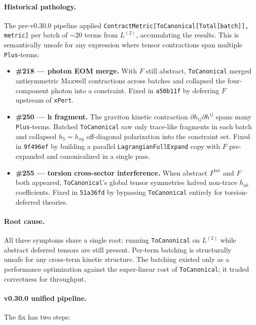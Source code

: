 \paragraph{Historical pathology.} The pre-v0.30.0 pipeline applied
\texttt{ContractMetric[ToCanonical[Total[batch]], metric]} per batch of
$\sim 20$ terms from $L^{(2)}$, accumulating the results. This is
semantically unsafe for any expression where tensor contractions span
multiple \texttt{Plus}-terms:

\begin{itemize}
  \item \textbf{\#218 — photon EOM merge.} With $F$ still abstract,
    \texttt{ToCanonical} merged antisymmetric Maxwell contractions across
    batches and collapsed the four-component photon into a constraint.
    Fixed in \texttt{a50b11f} by deferring $F$ upstream of \texttt{xPert}.
  \item \textbf{\#250 — h fragment.} The graviton
    kinetic contraction $\partial h_{ij} \partial h^{ij}$ spans many
    \texttt{Plus}-terms. Batched \texttt{ToCanonical} saw only trace-like
    fragments in each batch and collapsed $h_5 = h_{xy}$
    off-diagonal polarization into the constraint set. Fixed in
    \texttt{9f496ef} by building a parallel \texttt{LagrangianFullExpand}
    copy with $F$ pre-expanded and canonicalized in a single pass.
  \item \textbf{\#255 — torsion cross-sector interference.} When abstract
    $F^{\text{tor}}$ and $F$ both appeared, \texttt{ToCanonical}'s global
    tensor symmetries halved non-trace $h_{ab}$ coefficients. Fixed in
    \texttt{51a36fd} by bypassing \texttt{ToCanonical} entirely for
    torsion-deferred theories.
\end{itemize}

\paragraph{Root cause.} All three symptoms share a single root: running
\texttt{ToCanonical} on $L^{(2)}$ while abstract deferred tensors are
still present. Per-term batching is structurally unsafe for any
cross-term kinetic structure. The batching existed only as a performance
optimization against the super-linear cost of \texttt{ToCanonical}; it
traded correctness for throughput.

\paragraph{v0.30.0 unified pipeline.} The fix has two steps:

